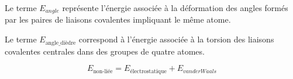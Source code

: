 	Le terme $E_{angle}$ représente l'énergie associée à la déformation des angles formés par les paires de liaisons covalentes impliquant le même atome.%
	
	Le terme $E_\text{angle\_{}dièdre}$ correspond à l'énergie associée à la \og torsion \fg{} des liaisons covalentes centrales dans des groupes de quatre atomes.%
	
%	
	
	
	\begin{equation}
		\label{eq:nonbonded}
		E_\text{non-liée} = E_\text{électrostatique} + E_{van der Waals}
	\end{equation}
	
